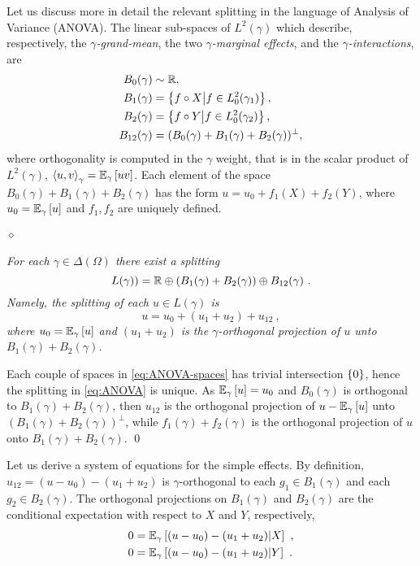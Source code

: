\documentclass[runningheads]{llncs}
\begin{document}
Let us discuss more in detail the relevant splitting in the language
of Analysis of Variance (ANOVA). The linear sub-spaces of $L^2(\gamma)$ which describe, respectively, the
\emph{$\gamma$-grand-mean}, the two \emph{$\gamma$-marginal effects}, and the \emph{$\gamma$-interactions}, are
%
\begin{equation}\label{eq:ANOVA-spaces}
\begin{aligned}
  B_0(\gamma) &\sim \mathbb R, \\
  B_1(\gamma) &= \left\{ f\circ X \middle| f \in L^2_0(\gamma_1) \right\},\\
  B_2(\gamma) &= \left\{ f\circ Y \middle| f \in L^2_0(\gamma_2) \right\},\\
  B_{12}(\gamma) &= (B_0(\gamma) + B_1(\gamma) + B_2(\gamma))^\perp,
\end{aligned}
\end{equation}
%
where orthogonality is computed in the $\gamma$ weight, that is in the scalar product of $L^2(\gamma)$, $\left\langle u , v \right\rangle_{\gamma} = {\operatorname{\mathbb E}}_{\gamma}\left[uv\right]$. Each element of the space $B_0(\gamma) + B_1(\gamma) + B_2(\gamma)$
has the form $u = u_0 + f_1(X) + f_2(Y)$, where
$u_0 = {\operatorname{\mathbb E}}_{\gamma}\left[u\right]$ and $f_1,f_2$ are uniquely defined.

\paragraph{$\bm\diamond$} \textit{For each $\gamma \in \Delta(\Omega)$ there exist a splitting
%
\begin{equation*}
%
  L(\gamma)) = \reals \oplus \left(B_1(\gamma) + B_2(\gamma)\right) \oplus B_{12}(\gamma) \ . 
\end{equation*}
%
Namely, the splitting of each $u \in L(\gamma)$ is
%
\begin{equation}
 \label{eq:ANOVA}
 u = u_0 + (u_1 + u_2) + u_{12} \ ,
\end{equation}
%
where $u_0={\operatorname{\mathbb E}}_{\gamma}\left[u\right]$ and $(u_1+u_2)$ is the
$\gamma$-orthogonal projection of $u$ unto
$B_1(\gamma) + B_2(\gamma)$.}

Each couple of spaces in \cref{eq:ANOVA-spaces} has trivial
intersection $\left\{ 0 \right\}$, hence the splitting in \cref{eq:ANOVA} is unique. As ${\operatorname{\mathbb E}}_{\gamma}\left[u\right] = u_0$ and $B_0(\gamma)$ is
orthogonal to $B_1(\gamma)+B_2(\gamma)$, then $u_{12}$ is the
orthogonal projection of $u - {\operatorname{\mathbb E}}_{\gamma}\left[u\right]$ unto
$(B_1(\gamma)+B_2(\gamma))^\perp$, while $f_1(\gamma)+f_2(\gamma)$ is
the orthogonal projection of $u$ onto $B_1(\gamma)+B_2(\gamma)$. \qed

Let us derive a system of equations for the simple effects. By definition, $u_{12} = (u - u_0) - (u_1 + u_2)$ is $\gamma$-orthogonal to each $g_1 \in B_1(\gamma)$ and each $g_2 \in B_2(\gamma)$. The orthogonal projections on $B_1(\gamma)$ and $B_2(\gamma)$ are the conditional expectation with respect to $X$ and $Y$, respectively,
%
  \begin{align*}
    0 &= {\operatorname{\mathbb E}}_{\gamma}\left[(u-u_0) - (u_1+u_2) \middle| X\right]  \ , \\
   0 &= {\operatorname{\mathbb E}}_{\gamma}\left[(u-u_0) - (u_1+u_2) \middle| Y\right] \ .
  \end{align*}
\end{document}
